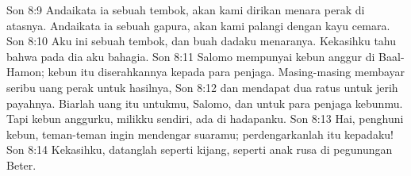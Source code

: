 Son 8:9  Andaikata ia sebuah tembok, akan kami dirikan menara perak di atasnya. Andaikata ia sebuah gapura, akan kami palangi dengan kayu cemara.
Son 8:10  Aku ini sebuah tembok, dan buah dadaku menaranya. Kekasihku tahu bahwa pada dia aku bahagia.
Son 8:11  Salomo mempunyai kebun anggur di Baal-Hamon; kebun itu diserahkannya kepada para penjaga. Masing-masing membayar seribu uang perak untuk hasilnya,
Son 8:12  dan mendapat dua ratus untuk jerih payahnya. Biarlah uang itu untukmu, Salomo, dan untuk para penjaga kebunmu. Tapi kebun anggurku, milikku sendiri, ada di hadapanku.
Son 8:13  Hai, penghuni kebun, teman-teman ingin mendengar suaramu; perdengarkanlah itu kepadaku!
Son 8:14  Kekasihku, datanglah seperti kijang, seperti anak rusa di pegunungan Beter.


